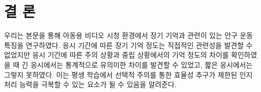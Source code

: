 \documentclass{kcc}
\begin{document}
\section{결 론}
우리는 본문을 통해 아동용 비디오 시청 환경에서 장기 기억과 관련이 있는 안구 운동 특징을 연구하였다. 응시 기간에 따른 장기 기억 정도는 직접적인 관련성을 발견할 수 없었지만 응시 기간에 따른 주의 상황과 중립 상황에서의 기억 정도의 차이를 확인하였을 때 긴 응시에서는 통계적으로 유의미한 차이를 발견할 수 있었고, 짧은 응시에서는 그렇지 못하였다. 이는 평생 학습에서 선택적 주의를 통한 효율성 추구가 제한된 인지 처리 능력을 극복할 수 있는 요소가 될 수 있음을 알려준다.




\end{document}
